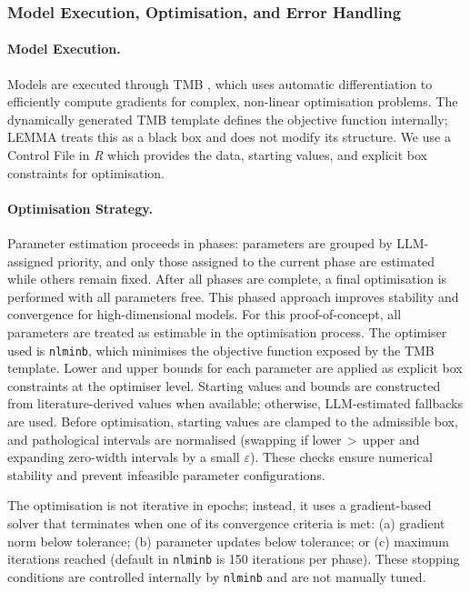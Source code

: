 \subsubsection{Model Execution, Optimisation, and Error Handling}

\paragraph{Model Execution.}
Models are executed through TMB \citep{kristensen2014tmb}, which uses automatic differentiation to efficiently compute gradients for complex, non-linear optimisation problems. The dynamically generated TMB template defines the objective function internally; LEMMA treats this as a black box and does not modify its structure. We use a Control File in \textit{R} which provides the data, starting values, and explicit box constraints for optimisation.

\paragraph{Optimisation Strategy.}
Parameter estimation proceeds in phases: parameters are grouped by LLM-assigned priority, and only those assigned to the current phase are estimated while others remain fixed. After all phases are complete, a final optimisation is performed with all parameters free. This phased approach improves stability and convergence for high-dimensional models. For this proof-of-concept, all parameters are treated as estimable in the optimisation process. The optimiser used is \texttt{nlminb}, which minimises the objective function exposed by the TMB template. Lower and upper bounds for each parameter are applied as explicit box constraints at the optimiser level. Starting values and bounds are constructed from literature-derived values when available; otherwise, LLM-estimated fallbacks are used. Before optimisation, starting values are clamped to the admissible box, and pathological intervals are normalised (swapping if lower\,$>$\,upper and expanding zero-width intervals by a small $\varepsilon$). These checks ensure numerical stability and prevent infeasible parameter configurations.

The optimisation is not iterative in epochs; instead, it uses a gradient-based solver that terminates when one of its convergence criteria is met: (a) gradient norm below tolerance; (b) parameter updates below tolerance; or (c) maximum iterations reached (default in \texttt{nlminb} is 150 iterations per phase). These stopping conditions are controlled internally by \texttt{nlminb} and are not manually tuned.

